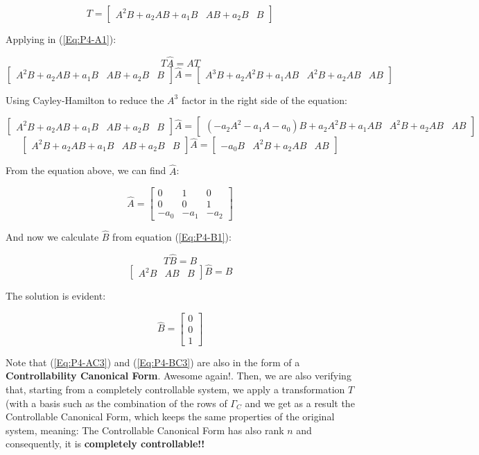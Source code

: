 \documentclass[10pt,a4paper]{article}
\begin{document}
\[
T = 
\begin{bmatrix}
A^{2}B + a_{2}AB + a_{1}B & AB + a_{2}B & B 
\end{bmatrix}
\]

Applying in (\ref{Eq:P4-A1}):

\[ T\hat{A} = AT \]
\[
\begin{bmatrix}
A^{2}B + a_{2}AB + a_{1}B & AB + a_{2}B & B 
\end{bmatrix}
\hat{A} =
\begin{bmatrix}
A^{3}B + a_{2}A^{2}B + a_{1}AB & A^{2}B + a_{2}AB & AB 
\end{bmatrix}
\]

Using Cayley-Hamilton to reduce the $A^{3}$ factor in the right side of the equation:

\[
\begin{bmatrix}
A^{2}B + a_{2}AB + a_{1}B & AB + a_{2}B & B
\end{bmatrix}
\hat{A} =
\begin{bmatrix}
(-a_{2}A^{2}-a_{1}A-a_{0})B + a_{2}A^{2}B + a_{1}AB & A^{2}B + a_{2}AB & AB 
\end{bmatrix}
\]
\[
\begin{bmatrix}
A^{2}B + a_{2}AB + a_{1}B & AB + a_{2}B & B\end{bmatrix}
\hat{A} =
\begin{bmatrix}
-a_{0}B & A^{2}B + a_{2}AB & AB 
\end{bmatrix}
\]

From the equation above, we can find $\hat{A}$:

\begin{equation}
\hat{A} =
\begin{bmatrix}
0 & 1 & 0 \\
0 & 0 & 1 \\
-a_{0} & -a_{1} & -a_{2} 
\end{bmatrix}
\label{Eq:P4-AC3} 
\end{equation}

And now we calculate $\hat{B}$ from equation (\ref{Eq:P4-B1}):

\[ T\hat{B} = B \]
\[ \begin{bmatrix}
A^{2}B & AB & B
\end{bmatrix}
\hat{B} = 
B \]

The solution is evident:

\begin{equation}
\hat{B} = 
\begin{bmatrix}
0 \\
0 \\
1
\end{bmatrix}
\label{Eq:P4-BC3}
\end{equation}

Note that (\ref{Eq:P4-AC3}) and (\ref{Eq:P4-BC3}) are also in the form of a  \textbf{Controllability Canonical Form}. Awesome again!. Then, we are also verifying that, starting from a completely  controllable system, we apply a transformation $T$ (with a basis such as the combination of the rows of $\Gamma_{C}$ and we get as a result the Controllable Canonical Form, which keeps the same properties of the original system, meaning: The Controllable Canonical Form has also rank $n$ and consequently, it is \textbf{completely controllable!!} 
\end{document}
